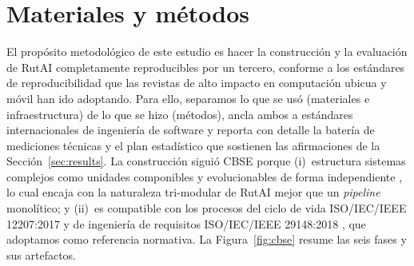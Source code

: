 \documentclass[a4paper,fleqn]{cas-sc}
\newcommand{\RUTAI}{RutAI\xspace}
\newcommand{\CBSE}{CBSE\xspace}
\begin{document}
	\section{Materiales y m\'etodos}\label{sec:method}
	
	El prop\'osito metodol\'ogico de este estudio es hacer la construcci\'on y la evaluaci\'on de \RUTAI completamente reproducibles por un tercero, conforme a los est\'andares de reproducibilidad que las revistas de alto impacto en computaci\'on ubicua y m\'ovil han ido adoptando. Para ello, separamos lo que se us\'o (materiales e infraestructura) de lo que se hizo (m\'etodos), ancla ambos a est\'andares internacionales de ingenier\'ia de software y reporta con detalle la bater\'ia de mediciones t\'ecnicas y el plan estad\'istico que sostienen las afirmaciones de la Secci\'on~\ref{sec:results}. La construcci\'on sigui\'o \CBSE porque (i)~estructura sistemas complejos como unidades componibles y evolucionables de forma independiente \citep{khan2022cbse,coullon2024cbse}, lo cual encaja con la naturaleza tri-modular de \RUTAI mejor que un \emph{pipeline} monol\'itico; y (ii)~es compatible con los procesos del ciclo de vida ISO/IEC/IEEE 12207:2017 \citep{iso12207} y de ingenier\'ia de requisitos ISO/IEC/IEEE 29148:2018 \citep{iso29148}, que adoptamos como referencia normativa. La Figura~\ref{fig:cbse} resume las seis fases y sus artefactos.
	
\end{document}
